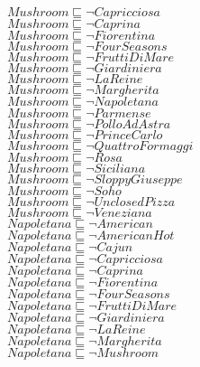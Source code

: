 \documentclass[a4paper,10pt]{article}
\begin{document}
 $Mushroom \sqsubseteq  \lnot Capricciosa$\\ 
 $Mushroom \sqsubseteq  \lnot Caprina$\\ 
 $Mushroom \sqsubseteq  \lnot Fiorentina$\\ 
 $Mushroom \sqsubseteq  \lnot FourSeasons$\\ 
 $Mushroom \sqsubseteq  \lnot FruttiDiMare$\\ 
 $Mushroom \sqsubseteq  \lnot Giardiniera$\\ 
 $Mushroom \sqsubseteq  \lnot LaReine$\\ 
 $Mushroom \sqsubseteq  \lnot Margherita$\\ 
 $Mushroom \sqsubseteq  \lnot Napoletana$\\ 
 $Mushroom \sqsubseteq  \lnot Parmense$\\ 
 $Mushroom \sqsubseteq  \lnot PolloAdAstra$\\ 
 $Mushroom \sqsubseteq  \lnot PrinceCarlo$\\ 
 $Mushroom \sqsubseteq  \lnot QuattroFormaggi$\\ 
 $Mushroom \sqsubseteq  \lnot Rosa$\\ 
 $Mushroom \sqsubseteq  \lnot Siciliana$\\ 
 $Mushroom \sqsubseteq  \lnot SloppyGiuseppe$\\ 
 $Mushroom \sqsubseteq  \lnot Soho$\\ 
 $Mushroom \sqsubseteq  \lnot UnclosedPizza$\\ 
 $Mushroom \sqsubseteq  \lnot Veneziana$\\ 
 $Napoletana \sqsubseteq  \lnot American$\\ 
 $Napoletana \sqsubseteq  \lnot AmericanHot$\\ 
 $Napoletana \sqsubseteq  \lnot Cajun$\\ 
 $Napoletana \sqsubseteq  \lnot Capricciosa$\\ 
 $Napoletana \sqsubseteq  \lnot Caprina$\\ 
 $Napoletana \sqsubseteq  \lnot Fiorentina$\\ 
 $Napoletana \sqsubseteq  \lnot FourSeasons$\\ 
 $Napoletana \sqsubseteq  \lnot FruttiDiMare$\\ 
 $Napoletana \sqsubseteq  \lnot Giardiniera$\\ 
 $Napoletana \sqsubseteq  \lnot LaReine$\\ 
 $Napoletana \sqsubseteq  \lnot Margherita$\\ 
 $Napoletana \sqsubseteq  \lnot Mushroom$\\ 
\end{document}
